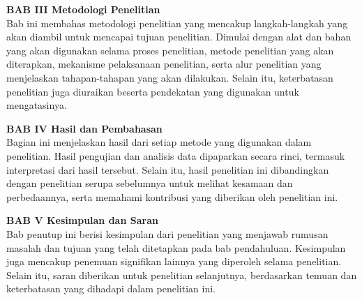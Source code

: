 \noindent \textbf{BAB III Metodologi Penelitian} \\
Bab ini membahas metodologi penelitian yang mencakup langkah-langkah yang akan diambil untuk mencapai tujuan penelitian. Dimulai dengan alat dan bahan yang akan digunakan selama proses penelitian, metode penelitian yang akan diterapkan, mekanisme pelaksanaan penelitian, serta alur penelitian yang menjelaskan tahapan-tahapan yang akan dilakukan. Selain itu, keterbatasan penelitian juga diuraikan beserta pendekatan yang digunakan untuk mengatasinya.

\noindent \textbf{BAB IV Hasil dan Pembahasan} \\
Bagian ini menjelaskan hasil dari setiap metode yang digunakan dalam penelitian. Hasil pengujian dan analisis data dipaparkan secara rinci, termasuk interpretasi dari hasil tersebut. Selain itu, hasil penelitian ini dibandingkan dengan penelitian serupa sebelumnya untuk melihat kesamaan dan perbedaannya, serta memahami kontribusi yang diberikan oleh penelitian ini.

\noindent \textbf{BAB V Kesimpulan dan Saran} \\
Bab penutup ini berisi kesimpulan dari penelitian yang menjawab rumusan masalah dan tujuan yang telah ditetapkan pada bab pendahuluan. Kesimpulan juga mencakup penemuan signifikan lainnya yang diperoleh selama penelitian. Selain itu, saran diberikan untuk penelitian selanjutnya, berdasarkan temuan dan keterbatasan yang dihadapi dalam penelitian ini.
